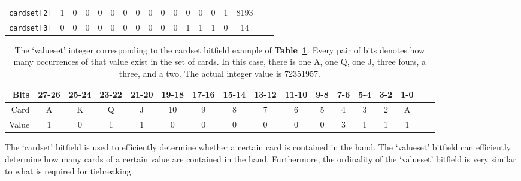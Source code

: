 \begin{table}[htb]
\begin{small}
\begin{center}
\begin{tabular}{|r|c|c|c|c|c|c|c|c|c|c|c|c|c|c|c|c|r|}
\texttt{cardset[2]} &     1            &    0            &  0              &  0              &  0 & 0  &  0 & 0  &  0 &  0 & 0   &  0   &  0   &  1    & 8193           \\
\texttt{cardset[3]} &     0            &     0           &  0              &  0              &   0 &   0&  0 &  0 &   0& 0  & 1  &  1   &  1   & 0     & 14      \\
\hline
\end{tabular}
\label{tab:CardsetBitfield}
\end{center}
\end{small}
\end{table}

\begin{table}[htb]
\captionsetup{position=top}
\caption[Valueset field]{The `valueset' integer corresponding to the cardset bitfield example of \textbf{Table~\ref{tab:CardsetBitfield}}.
Every pair of bits denotes how many occurrences of that value exist in the set of cards.
In this case, there is one A, one Q, one J, three fours, a three, and a two.
The actual integer value is 72351957.}
\begin{small}
\begin{center}
\begin{tabular}{|r|c|c|c|c|c|c|c|c|c|c|c|c|c|c|c|c|}
\hline
Bits    &  27-26 & 25-24 & 23-22 & 21-20 & 19-18 & 17-16 & 15-14 & 13-12 & 11-10 & 9-8 & 7-6 & 5-4 & 3-2 & 1-0                       \\ \hline
Card    &    A    &     K & Q     & J     & 10    &     9 &     8 & 7     &     6 &  5  &   4 &   3 & 2   & A                          \\ \hline
Value  &    1    &0      & 1     &  1    &  0    & 0     &  0    &  0    &  0    &0    &  3  & 1   & 1   & 1     \\
\hline
\end{tabular}
\label{tab:ValuesetInteger}
\end{center}
\end{small}
\end{table}

The `cardset' bitfield is used to efficiently determine whether a certain card is contained in the hand.
The `valueset' bitfield can efficiently determine how many cards of a certain value are contained in the hand.
Furthermore, the ordinality of the `valueset' bitfield is very similar to what is required for tiebreaking.



